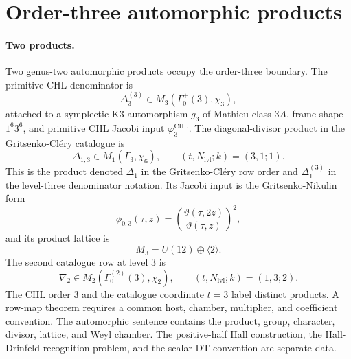\providecommand{\kBKM}{\kappa_{\mathrm{BKM}}}
\providecommand{\kch}{\kappa_{\mathrm{ch}}}
\providecommand{\kcat}{\kappa_{\mathrm{cat}}}
\providecommand{\kHeis}{\kappa_{\mathrm{ch}}^{\mathrm{Heis}}}
\providecommand{\kfib}{\kappa_{\mathrm{fiber}}}
\providecommand{\Z}{\mathbb{Z}}
\providecommand{\R}{\mathbb{R}}
\providecommand{\cO}{\mathcal{O}}
\providecommand{\Hup}{\mathbb{H}_{2}}
\providecommand{\wt}{\operatorname{wt}}
\providecommand{\DeltaCHLThree}{\Delta_{3}^{(3)}}
\providecommand{\DeltaDDThree}{\Delta_{1,3}}
\providecommand{\NablaThree}{\nabla_{2}}
\providecommand{\GammaDDThree}{\Gamma_{3}}
\providecommand{\GammaCHLThree}{\Gamma_{0}^{+}(3)}
\providecommand{\gDeltaCHLThree}{\mathfrak{g}_{\Delta_{3}^{(3)}}}
\providecommand{\fgGNThree}{\mathfrak{g}_{3}^{\mathrm{GN}}}
\providecommand{\varphiCHLThree}{\varphi_{3}^{\mathrm{CHL}}}
\providecommand{\phiDDThree}{\phi_{0,3}}
\providecommand{\GammaDDProd}{\Gamma_{3}^{\mathrm{prod}}}
\providecommand{\Hdiag}{\mathcal{H}_{\mathrm{diag}}}

\section*{Order-three automorphic products}
\label{sec:N3-automorphic-products}

\paragraph{Two products.}
Two genus-two automorphic products occupy the order-three boundary.
The primitive CHL denominator is
\[
  \DeltaCHLThree\in M_3(\GammaCHLThree,\chi_3),
\]
attached to a symplectic K3 automorphism \(g_3\) of Mathieu class
\(3A\), frame shape \(1^6 3^6\), and primitive CHL Jacobi input
\(\varphiCHLThree\).  The diagonal-divisor product in the
Gritsenko-Cl\'ery catalogue is
\[
  \DeltaDDThree\in M_1(\GammaDDThree,\chi_6),
  \qquad (t,N_{\mathrm{lvl}};k)=(3,1;1).
\]
This is the product denoted \(\Delta_1\) in the
Gritsenko-Cl\'ery row order and \(\Delta_{1}^{(3)}\) in the
level-three denominator notation.
Its Jacobi input is the Gritsenko-Nikulin form
\[
  \phiDDThree(\tau,z)
  =
  \left(\frac{\vartheta(\tau,2z)}{\vartheta(\tau,z)}\right)^2,
\]
and its product lattice is
\[
  M_3=U(12)\oplus\langle2\rangle.
\]
The second catalogue row at level \(3\) is
\[
  \NablaThree\in M_2(\Gamma^{(2)}_0(3),\chi_2),
  \qquad (t,N_{\mathrm{lvl}};k)=(1,3;2).
\]
The CHL order \(3\) and the catalogue coordinate \(t=3\) label
distinct products.  A row-map theorem requires a common host, chamber,
multiplier, and coefficient convention.  The automorphic sentence
contains the product, group, character, divisor, lattice, and Weyl
chamber.  The positive-half Hall construction, the Hall-Drinfeld
recognition problem, and the scalar DT convention are separate data.

